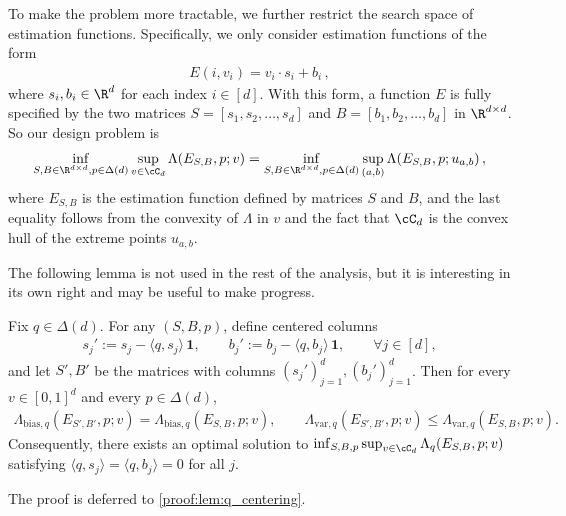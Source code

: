 
To make the problem more tractable, we further restrict the search space of estimation functions.
Specifically, we only consider estimation functions of the form
\begin{align*}
    E(i, v_i) = v_i \cdot s_i + b_i\,,
\end{align*}
where $s_i, b_i \in \R^d$ for each index $i \in [d]$.
With this form, a function $E$ is fully specified by the two matrices $S = [s_1, s_2, \ldots, s_d]$ and $B = [b_1, b_2, \ldots, b_d]$ in $\R^{d \times d}$.
So our design problem is
\begin{align*}
    \inf_{S, B \in \R^{d \times d}, p \in \Delta(d)} \sup_{v \in \cC_d} \Lambda(E_{S,B},p; v)
    = \inf_{S, B \in \R^{d \times d}, p \in \Delta(d)} \sup_{(a,b)} \Lambda(E_{S,B},p; u_{a,b})\,,
\end{align*}
where $E_{S,B}$ is the estimation function defined by matrices $S$ and $B$,
and the last equality follows from the convexity of $\Lambda$ in $v$ and the fact that $\cC_d$ is the convex hull of the extreme points $u_{a,b}$.

The following lemma is not used in the rest of the analysis, but it is interesting in its own right and may be useful to make progress.
\begin{lemma}
    \label{lem:q_centering}
    Fix $q\in\Delta(d)$. For any $(S,B,p)$, define centered columns
    \begin{align*}
        s_j' := s_j - \langle q,s_j\rangle\,\mathbf{1},
        \qquad
        b_j' := b_j - \langle q,b_j\rangle\,\mathbf{1},
        \qquad \forall j\in[d],
    \end{align*}
    and let $S',B'$ be the matrices with columns $(s_j')_{j=1}^d,(b_j')_{j=1}^d$.
    Then for every $v\in[0,1]^d$ and every $p\in\Delta(d)$,
    \begin{align*}
        \Lambda_{\text{bias},q}(E_{S',B'},p;v) = \Lambda_{\text{bias},q}(E_{S,B},p;v),
        \qquad
        \Lambda_{\text{var},q}(E_{S',B'},p;v) \le \Lambda_{\text{var},q}(E_{S,B},p;v).
    \end{align*}
    Consequently, there exists an optimal solution to
    $\inf_{S,B,p}\sup_{v\in\cC_d}\Lambda_q(E_{S,B},p;v)$ satisfying
    $\langle q,s_j\rangle=\langle q,b_j\rangle=0$ for all $j$.
\end{lemma}
\noindent The proof is deferred to \ref{proof:lem:q_centering}.

